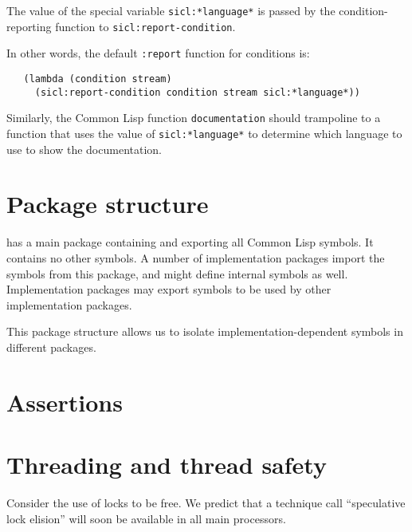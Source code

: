 The value of the special variable \texttt{sicl:*language*} is passed
by the condition-reporting function to \texttt{sicl:report-condition}.

In other words, the default \texttt{:report} function for conditions is:

\begin{verbatim}
   (lambda (condition stream) 
     (sicl:report-condition condition stream sicl:*language*))
\end{verbatim}

Similarly, the Common Lisp function \texttt{documentation} should
trampoline to a function that uses the value of
\texttt{sicl:*language*} to determine which language to use to show
the documentation. 

\section{Package structure}

{\sysname} has a main package containing and exporting all Common Lisp
symbols.  It contains no other symbols.  A number of implementation
packages import the symbols from this package, and might define
internal symbols as well.  Implementation packages may export symbols
to be used by other implementation packages.

This package structure allows us to isolate implementation-dependent
symbols in different packages.  

\section{Assertions}

\section{Threading and thread safety}

Consider the use of locks to be free.  We predict that a technique
call ``speculative lock elision'' will soon be available in all main
processors.


